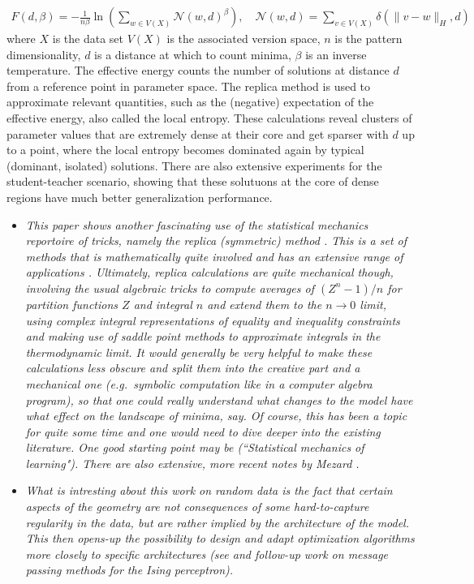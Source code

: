 \documentclass[10pt,a4paper]{article}
\begin{document}
\begin{enumerate}
\begin{align}
F(d,\beta) = -\frac{1}{n\beta} \ln \left( \sum_{w \in V(X)}  \mathcal N(w,d)^\beta \right), \quad 
\mathcal N(w,d) = \sum_{v \in V(X)} \delta(\|v-w\|_H, d)\,
\end{align}
where $X$ is the data set $V(X)$ is the associated version space, $n$ is the pattern dimensionality, $d$ is a distance at which to count minima,  $\beta$ is an inverse temperature. The effective energy counts the number of solutions at distance $d$ from a reference point in parameter space. The replica method is used to approximate relevant quantities, such as the (negative) expectation of the effective energy, also called the local entropy. These calculations reveal clusters of parameter values that are extremely dense at their core and get sparser with $d$ up to a point, where  the local entropy becomes dominated again by typical (dominant, isolated) solutions. There are also extensive experiments for the student-teacher scenario, showing that these solutuons at the core of dense  regions have much better generalization performance. 
\begin{itemize} 
\item \textit{This paper shows another fascinating use of the statistical mechanics reportoire of tricks, namely the replica (symmetric) method \cite{mezard1985replicas}. This is a set of methods that is mathematically quite involved  and has an extensive range of applications \cite{mezard1987spin}. Ultimately, replica calculations are quite mechanical though, involving the usual algebraic tricks to compute averages of $(Z^n-1)/n$ for partition functions $Z$ and integral $n$ and extend them to the $n \to 0$ limit, using complex integral representations of equality and inequality constraints and making use of saddle point methods to approximate integrals in the thermodynamic limit. It would generally be very helpful to make these calculations less obscure and split them into the creative part and a mechanical one (e.g.~symbolic computation like in a computer algebra program), so that one could really understand what changes to the model have what effect on the landscape of minima, say. Of course, this has been a topic for quite some time and one would need to dive deeper into the existing literature. One good starting point may be \cite{engel2001statistical} (``Statistical mechanics of learning"). There are also extensive, more recent notes by Mezard .}
\item \textit{What is intresting about this work on random data is the fact that certain aspects of the geometry are not consequences of some hard-to-capture regularity in the data, but are rather implied by the architecture of the model. This then opens-up the possibility to design and adapt optimization algorithms more closely to specific architectures (see \cite{braunstein2006learning} and follow-up work on message passing methods for the Ising perceptron).}

\end{itemize}
\end{enumerate}
\end{document}
